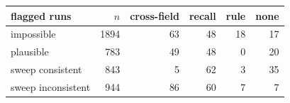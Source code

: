 \begin{tabular}{lrrrrr}
\toprule
flagged runs & $n$ & cross-field & recall & rule & none \\
\midrule
impossible & 1894 & 63 & 48 & 18 & 17 \\
plausible & 783 & 49 & 48 & 0 & 20 \\
sweep consistent & 843 & 5 & 62 & 3 & 35 \\
sweep inconsistent & 944 & 86 & 60 & 7 & 7 \\
\bottomrule
\end{tabular}
